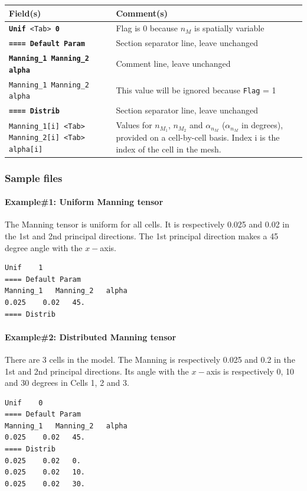     \begin{tabular}{p{6cm} | p{9cm}}
    \hline
    Field(s) & Comment(s) \\
    \hline  \hline
    \texttt{\textbf{Unif} <Tab> \textbf{0}} & Flag is 0 because $n_M$ is spatially variable \\ \hline
    \texttt{\textbf{==== Default Param}} & Section separator line, leave unchanged \\  \hline
    \texttt{\textbf{Manning\_1 Manning\_2 alpha}} & Comment line, leave unchanged \\  \hline
    \texttt{Manning\_1 Manning\_2 alpha}     & This value will be ignored because \texttt{Flag} = 1 \\ \hline
    \texttt{\textbf{==== Distrib}} & Section separator line, leave unchanged \\  \hline
    \texttt{Manning\_1[i] <Tab> Manning\_2[i] <Tab> alpha[i]}      & Values for $n_{M_1}$, $n_{M_2}$ and $\alpha_{n_M}$ ($\alpha_{n_M}$ in degrees), provided on a cell-by-cell basis. Index i is the index of the cell in the mesh.  \\ \hline
    \end{tabular}
%
\subsubsection{Sample files}
%
\paragraph*{Example\#1: Uniform Manning tensor}
The Manning tensor is uniform for all cells. It is respectively 0.025 and 0.02 in the 1st and 2nd principal directions. The 1st principal direction makes a 45 degree angle with the $x-$axis.
\begin{verbatim}
Unif	1
==== Default Param
Manning_1	Manning_2	alpha
0.025    0.02	45.
==== Distrib
\end{verbatim}
%
\paragraph*{Example\#2: Distributed Manning tensor}
There are 3 cells in the model. The Manning is respectively 0.025 and 0.2 in the 1st and 2nd principal directions. Its angle with the $x-$axis is respectively 0, 10 and 30 degrees in Cells 1, 2 and 3.
\begin{verbatim}
Unif	0
==== Default Param
Manning_1	Manning_2	alpha
0.025    0.02	45.
==== Distrib
0.025    0.02	0.
0.025    0.02	10.
0.025    0.02	30.
\end{verbatim}